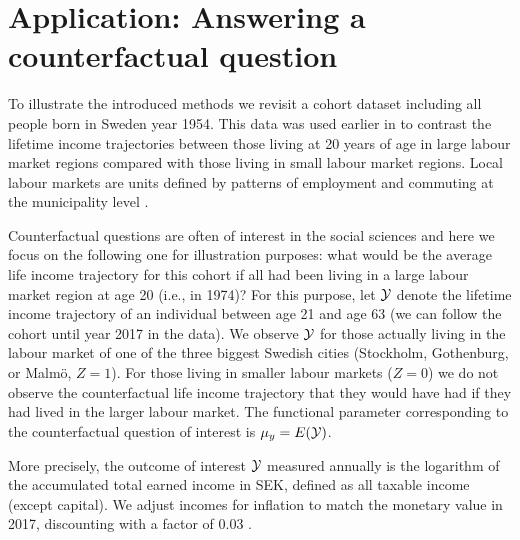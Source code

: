 \documentclass[12pt, A4]{article}
\begin{document}
    \section{Application: Answering a counterfactual question}\label{sec:app}
        To illustrate the introduced methods we revisit a cohort dataset including all people born in Sweden year 1954. 
        This data was used earlier in \cite{ecker2023causal} to contrast the lifetime income trajectories between those living at 20 years of age in large labour market regions compared with those living in small labour market regions. 
        Local labour markets are units defined by patterns of employment and commuting at the municipality level \cite{LA2,LA}. 

        Counterfactual questions are often of interest in the social sciences and here we focus on the following one for illustration purposes: what would be the average life income trajectory for this cohort if all had been living in a large labour market region at age 20 (i.e., in 1974)? 
        For this purpose, let $\cal Y$ denote the lifetime income trajectory of an individual between age 21 and age 63 (we can follow the cohort until year 2017 in the data). 
        We observe $\cal Y$ for those actually living in the labour market of one of the three biggest Swedish cities (Stockholm, Gothenburg, or Malmö, $Z=1$). 
        For those living in smaller labour markets ($Z=0$) we do not observe the counterfactual life income trajectory that they would have had if they had lived in the larger labour market. The functional parameter corresponding to the counterfactual question of interest is $\mu_{y}=E(\cal Y)$. 

        More precisely, the outcome of interest $\cal Y$ measured annually is the logarithm of the accumulated total earned income in SEK, defined as all taxable income (except capital). We adjust incomes for inflation to match the monetary value in 2017, discounting with a factor of 0.03 \cite{disk}. 
        
\end{document}
